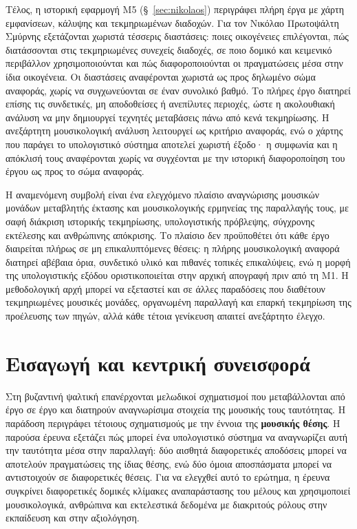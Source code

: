 \documentclass[11pt,a4paper]{article}
\begin{document}
Τέλος, η ιστορική εφαρμογή M5 (§~\ref{sec:nikolaos}) περιγράφει πλήρη έργα με χάρτη εμφανίσεων, κάλυψης και τεκμηριωμένων διαδοχών. Για τον Νικόλαο Πρωτοψάλτη Σμύρνης εξετάζονται χωριστά τέσσερις διαστάσεις: ποιες οικογένειες επιλέγονται, πώς διατάσσονται στις τεκμηριωμένες συνεχείς διαδοχές, σε ποιο δομικό και κειμενικό περιβάλλον χρησιμοποιούνται και πώς διαφοροποιούνται οι πραγματώσεις μέσα στην ίδια οικογένεια. Οι διαστάσεις αναφέρονται χωριστά ως προς δηλωμένο σώμα αναφοράς, χωρίς να συγχωνεύονται σε έναν συνολικό βαθμό. Το πλήρες έργο διατηρεί επίσης τις συνδετικές, μη αποδοθείσες ή ανεπίλυτες περιοχές, ώστε η ακολουθιακή ανάλυση να μην δημιουργεί τεχνητές μεταβάσεις πάνω από κενά τεκμηρίωσης. Η ανεξάρτητη μουσικολογική ανάλυση λειτουργεί ως κριτήριο αναφοράς, ενώ ο χάρτης που παράγει το υπολογιστικό σύστημα αποτελεί χωριστή έξοδο· η συμφωνία και η απόκλισή τους αναφέρονται χωρίς να συγχέονται με την ιστορική διαφοροποίηση του έργου ως προς το σώμα αναφοράς.

Η αναμενόμενη συμβολή είναι ένα ελεγχόμενο πλαίσιο αναγνώρισης μουσικών μονάδων μεταβλητής έκτασης και μουσικολογικής ερμηνείας της παραλλαγής τους, με σαφή διάκριση ιστορικής τεκμηρίωσης, υπολογιστικής πρόβλεψης, σύγχρονης εκτέλεσης και ανθρώπινης απόκρισης. Το πλαίσιο δεν προϋποθέτει ότι κάθε έργο διαιρείται πλήρως σε μη επικαλυπτόμενες θέσεις: η πλήρης μουσικολογική αναφορά διατηρεί αβέβαια όρια, συνδετικό υλικό και πιθανές τοπικές επικαλύψεις, ενώ η μορφή της υπολογιστικής εξόδου οριστικοποιείται στην αρχική απογραφή πριν από τη M1. Η μεθοδολογική αρχή μπορεί να εξεταστεί και σε άλλες παραδόσεις που διαθέτουν τεκμηριωμένες μουσικές μονάδες, οργανωμένη παραλλαγή και επαρκή τεκμηρίωση της προέλευσης των πηγών, αλλά κάθε τέτοια γενίκευση απαιτεί ανεξάρτητο έλεγχο.

\clearpage
\setcounter{tocdepth}{1}
\tableofcontents
\clearpage

\section{Εισαγωγή και κεντρική συνεισφορά}

Στη βυζαντινή ψαλτική επανέρχονται μελωδικοί σχηματισμοί που μεταβάλλονται από έργο σε έργο και διατηρούν αναγνωρίσιμα στοιχεία της μουσικής τους ταυτότητας. Η παράδοση περιγράφει τέτοιους σχηματισμούς με την έννοια της \textbf{μουσικής θέσης}. Η παρούσα έρευνα εξετάζει πώς μπορεί ένα υπολογιστικό σύστημα να αναγνωρίζει αυτή την ταυτότητα μέσα στην παραλλαγή: δύο αισθητά διαφορετικές αποδόσεις μπορεί να αποτελούν πραγματώσεις της ίδιας θέσης, ενώ δύο όμοια αποσπάσματα μπορεί να αντιστοιχούν σε διαφορετικές θέσεις. Για να ελεγχθεί αυτό το ερώτημα, η έρευνα συγκρίνει διαφορετικές δομικές κλίμακες αναπαράστασης του μέλους και χρησιμοποιεί μουσικολογικά, ανθρώπινα και εκτελεστικά δεδομένα με διακριτούς ρόλους στην εκπαίδευση και στην αξιολόγηση.
\end{document}

